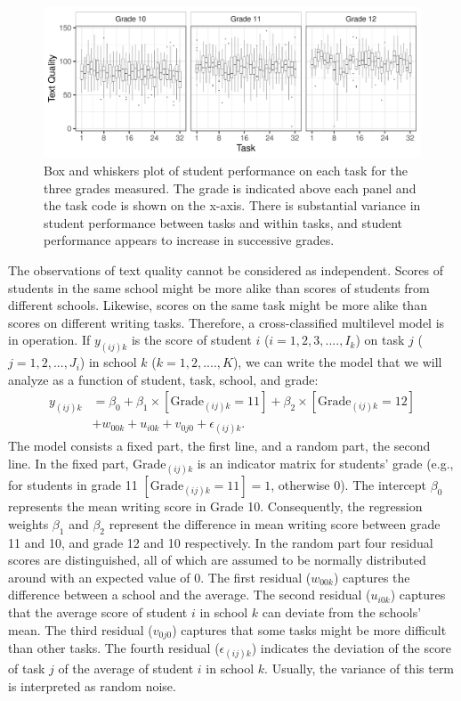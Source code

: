 \documentclass[a4paper]{article}
\begin{document}
\begin{figure}[!ht]
	\includegraphics[width=\textwidth]{descriptivesBaseline.pdf}
	\caption{Box and whiskers plot of student performance on each task for the three grades measured. The grade is indicated above each panel and the task code is shown on the x-axis. There is substantial variance in student performance between tasks and within tasks, and student performance appears to increase in successive grades.}
	\label{fig:baselineDescriptives}
\end{figure}
The observations of text quality cannot be considered as independent.
Scores of students in the same school might be more alike than scores of students from different schools.
Likewise, scores on the same task might be more alike than scores on different writing tasks.
Therefore, a cross-classified multilevel model is in operation.
If $y_{(ij)k}$ is the score of student $i$ ($i = 1, 2, 3, ...., I_k$) on task $j$ ($j = 1, 2, ..., J_i$) in school $k$ ($k = 1, 2, ...., K$), we can write the model that we will analyze as a function of student, task, school, and grade:
\begin{align*}
	y_{(ij)k} &= \beta_0 + \beta_1 \times [\mathrm{Grade}_{(ij)k}=11] + \beta_2 \times [\mathrm{Grade}_{(ij)k}=12]\\
			  &+ w_{00k} + u_{i0k} + v_{0j0} + \epsilon_{(ij)k}.
\end{align*}
The model consists a fixed part, the first line, and a random part, the second line. In the fixed part, $\mathrm{Grade}_{(ij)k}$ is an indicator matrix for students' grade (e.g., for students in grade 11 $[\mathrm{Grade}_{(ij)k}=11] = 1$, otherwise 0). The intercept $\beta_0$ represents the mean writing score in Grade 10. Consequently, the regression weights $\beta_1$ and $\beta_2$ represent the difference in mean writing score between grade 11 and 10, and grade 12 and 10 respectively. In the random part four residual scores are distinguished, all of which are assumed to be normally distributed around with an expected value of 0. The first residual ($w_{00k}$) captures the difference between a school and the average. The second residual ($u_{i0k}$) captures that the average score of student $i$ in school $k$ can deviate from the schools' mean. The third residual ($v_{0j0}$) captures that some tasks might be more difficult than other tasks. The fourth residual ($\epsilon_{(ij)k}$) indicates the deviation of the score of task $j$ of the average of student $i$ in school $k$. Usually, the variance of this term is interpreted as random noise.
\end{document}
